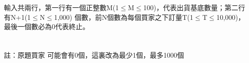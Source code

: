 輸入共兩行，第一行有一個正整數M(1$\leq$M$\leq$100)，代表出貨基底數量；第二行有N+1(1$\leq$N$\leq$1,000) 個數，前N個數為每個買家之下訂量T(1$\leq$T$\leq$10,000)，最後一個數必為0代表終止。\\
\\
\\
{註：原題買家 可能會有0個，這裏改為最少1個，最多1000個}